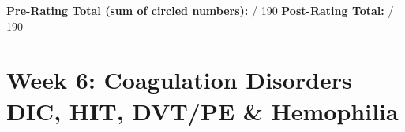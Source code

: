 \documentclass[11pt,letterpaper]{article}
\newcommand{\blank}[1][3cm]{\underline{\hspace{#1}}}
\begin{document}
\begin{selfbox}
\vspace{0.2cm}
\textbf{Pre-Rating Total (sum of circled numbers):} \blank[2cm] / 190
\quad\textbf{Post-Rating Total:} \blank[2cm] / 190
\end{selfbox}

\newpage


\section{Week 6: Coagulation Disorders --- DIC, HIT, DVT/PE \& Hemophilia}
\end{document}
